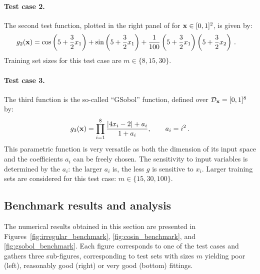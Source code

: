 \paragraph{Test case 2.}

The second test function, plotted in the right panel of  for ${\bf x}\in[0,1]^2$, is given by:
\begin{align*}
   g_2({\bf x}) 
   &= \cos \left(5 + \frac{3}{2}x_1 \right) + \sin \left(5 + \frac{3}{2}x_1 \right) 
   + \frac{1}{100} \left(5 + \frac{3}{2}x_1 \right) \left(5 + \frac{3}{2}x_2 \right)\,.
\end{align*}
Training set sizes for this test case are $m\in\{8, 15, 30\}$.

\paragraph{Test case 3.}

The third function is the so-called ``GSobol'' function, defined over $\mathcal{D}_{\bf x}=[0,1]^8$ by:
\begin{equation*}
  g_3({\bf x}) = \prod_{i=1}^{8} \frac{|4x_i - 2| + a_i}{1 + a_i}, \qquad a_i = i^2 \,.
\end{equation*}
This parametric function is very versatile as both the dimension of its input space and the coefficients $a_i$ can be freely chosen. 
The sensitivity to input variables is determined by the $a_i$: the larger $a_i$ is, the less $g$ is sensitive to $x_i$. 
Larger training sets are considered for this test case: $m\in\{15, 30, 100\}$.

\subsection{Benchmark results and analysis}

The numerical results obtained in this section are presented in Figures~\ref{fig:irregular_benchmark}, \ref{fig:cosin_benchmark}, and \ref{fig:gsobol_benchmark}. 
Each figure corresponds to one of the test cases and gathers three sub-figures, corresponding to test sets with sizes $m$ yielding poor (left), reasonably good (right) or very good (bottom) fittings. 
 
